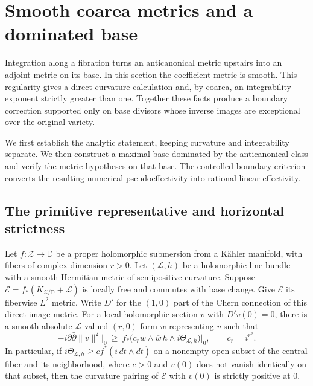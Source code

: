\section{Smooth coarea metrics and a dominated base}
\label{coa:analytic-tools}

Integration along a fibration turns an anticanonical metric upstairs into
an adjoint metric on its base.  In this section the coefficient metric is
smooth.  This regularity gives a direct curvature calculation and, by
coarea, an integrability exponent strictly greater than one.  Together
these facts produce a boundary correction supported only on base divisors
whose inverse images are exceptional over the original variety.

We first establish the analytic statement, keeping curvature and
integrability separate.  We then construct a maximal base dominated by
the anticanonical class and verify the metric hypotheses on that base.
The controlled-boundary criterion converts the resulting numerical
pseudoeffectivity into rational linear effectivity.

\subsection{The primitive representative and horizontal strictness}

\begin{lemma}\label{coa:curvature}
Let $f:\mathcal Z\to\mathbb D$ be a proper holomorphic submersion from a
K\"ahler manifold, with fibers of complex dimension $r>0$.  Let
$(\mathcal L,h)$ be a holomorphic line bundle with a smooth Hermitian metric
of semipositive curvature.  Suppose
$\mathcal E=f_*(K_{\mathcal Z/\mathbb D}+\mathcal L)$ is locally free and
commutes with base change.  Give $\mathcal E$ its fiberwise $L^2$ metric.
Write $D'$ for the $(1,0)$ part of the Chern connection of this
direct-image metric.  For a local holomorphic section $v$ with
$D'v(0)=0$, there is a smooth
absolute $\mathcal L$-valued $(r,0)$-form $w$ representing $v$ such that
\begin{equation}\label{coa:curvature-bound}
 -i\partial\bar\partial\|v\|^2\big|_0
 \ \geq\
 f_*\bigl(c_r w\wedge\overline w\,h\wedge i\Theta_{\mathcal L,h}\bigr)
 \big|_0,\qquad c_r=i^{r^2}.
\end{equation}
In particular, if $i\Theta_{\mathcal L,h}\geq c f^*(i\,dt\wedge d\bar t)$
on a nonempty open subset of the central fiber and its neighborhood,
where $c>0$ and $v(0)$ does not vanish identically on that subset, then the
curvature pairing of $\mathcal E$ with $v(0)$ is strictly positive at $0$.
\end{lemma}

